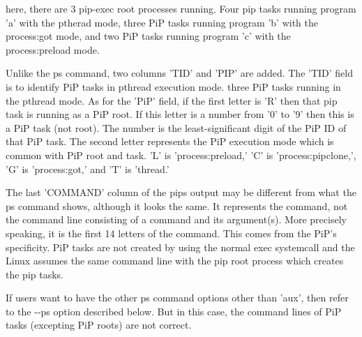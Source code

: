 here, there are 3 {\ttfamily pip-\/exec} root processes running. Four pip tasks running program 'a' with the ptherad mode, three Pi\-P tasks running program 'b' with the process\-:got mode, and two Pi\-P tasks running program 'c' with the process\-:preload mode.

Unlike the {\ttfamily ps} command, two columns 'T\-I\-D' and 'P\-I\-P' are added. The 'T\-I\-D' field is to identify Pi\-P tasks in pthread execution mode. three Pi\-P tasks running in the pthread mode. As for the 'Pi\-P' field, if the first letter is 'R' then that pip task is running as a Pi\-P root. If this letter is a number from '0' to '9' then this is a Pi\-P task (not root). The number is the least-\/significant digit of the Pi\-P I\-D of that Pi\-P task. The second letter represents the Pi\-P execution mode which is common with Pi\-P root and task. 'L' is 'process\-:preload,' 'C' is 'process\-:pipclone,', 'G' is 'process\-:got,' and 'T' is 'thread.'

The last 'C\-O\-M\-M\-A\-N\-D' column of the {\ttfamily pips} output may be different from what the {\ttfamily ps} command shows, although it looks the same. It represents the command, not the command line consisting of a command and its argument(s). More precisely speaking, it is the first 14 letters of the command. This comes from the Pi\-P's specificity. Pi\-P tasks are not created by using the normal {\ttfamily exec} systemcall and the Linux assumes the same command line with the pip root process which creates the pip tasks.

If users want to have the other {\ttfamily ps} command options other than 'aux', then refer to the {\ttfamily -\/-\/ps} option described below. But in this case, the command lines of Pi\-P tasks (excepting Pi\-P roots) are not correct.


